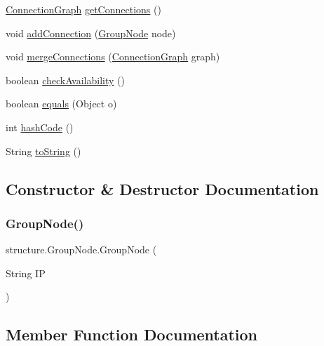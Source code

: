 \begin{DoxyCompactItemize}
\hyperlink{classstructure_1_1_connection_graph}{Connection\+Graph} \hyperlink{classstructure_1_1_group_node_a13b5457f1b989a0aa8da6440610882fb}{get\+Connections} ()
\item 
void \hyperlink{classstructure_1_1_group_node_acd052974ff110c595e1ab115460a08c4}{add\+Connection} (\hyperlink{classstructure_1_1_group_node}{Group\+Node} node)
\item 
void \hyperlink{classstructure_1_1_group_node_afdecedab839a4aca2282a2ddce6290cb}{merge\+Connections} (\hyperlink{classstructure_1_1_connection_graph}{Connection\+Graph} graph)
\item 
boolean \hyperlink{classstructure_1_1_group_node_a4c529c68ff5c5a1951967a620305ce9a}{check\+Availability} ()
\item 
boolean \hyperlink{classstructure_1_1_group_node_ac13e06c08ea2141b48ce07d5e50e512e}{equals} (Object o)
\item 
int \hyperlink{classstructure_1_1_group_node_aa3e51b1b49633aa9a458dd85b2dc1629}{hash\+Code} ()
\item 
String \hyperlink{classstructure_1_1_group_node_ab0076e02c1b7c6934ee012dfd3fe94e7}{to\+String} ()
\end{DoxyCompactItemize}


\subsection{Constructor \& Destructor Documentation}
\mbox{\label{classstructure_1_1_group_node_a22c95192d00d8f968102e79bee9b55d9}} 
\subsubsection{\texorpdfstring{Group\+Node()}{GroupNode()}}
{\footnotesize\ttfamily structure.\+Group\+Node.\+Group\+Node (\begin{DoxyParamCaption}\item[{String}]{IP }\end{DoxyParamCaption})}



\subsection{Member Function Documentation}
\mbox{\label{classstructure_1_1_group_node_acd052974ff110c595e1ab115460a08c4}} 
